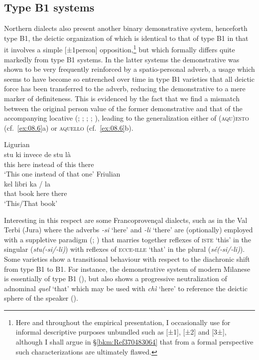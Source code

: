\documentclass[output=paper]{langsci/langscibook}
\begin{document}
\subsection{Type B1 systems}\label{bkm:Ref370487849}

Northern  dialects also present another binary demonstrative system,\linebreak
henceforth type B1, the deictic organization of which is identical to
that of type B1 in that it involves a simple [±1person]
opposition,\footnote{Here and throughout the empirical presentation, I
    occasionally use for informal descriptive purposes unbundled 
    such as [±1], [±2] and [3±], although I shall argue in
    §\ref{bkm:Ref370483064} that from a formal perspective such characterizations
are ultimately flawed.} but which formally differs quite markedly from type
B1 systems. In the latter systems the demonstrative was shown to be very
frequently reinforced by a spatio-personal adverb, a usage which seems to have
become so entrenched over time in type B1 varieties that all deictic
force has been transferred to the adverb, reducing the demonstrative to a mere
marker of definiteness. This is evidenced by the fact that we find a mismatch
between the original person value of the former demonstrative and that of the
accompanying locative (\citealt[21]{Berruto:1974a};
\citealt[171]{Azaretti:1982a}; \citealt[241]{Parry:1997a};
\citealt[112f]{Vanelli:1997a}; \citealt[107--110]{Irsara:2009a}), leading to
the generalization either of (\textsc{aqu)esto} (cf.\ \ref{ex:08.6}a) or \textsc{aquello} (cf.\ \ref{ex:08.6}b).

\ea\label{ex:08.6}
\ea\label{bkm:Ref370498429}Ligurian \citep{Azaretti:1982a}\\
\gll     stu  ki  invece  de  stu  là\\
this  here  instead  of  this  there\\
\glt \enquote*{This one instead of that one}
\ex Friulian \citep{Vanelli:1997a}\\
\gll  kel  libri  ka  /  la\\
that  book  here {} there\\
\glt \enquote*{This/That book}
\z
\z

Interesting in this respect are some Francoprovençal dialects, such as in the
Val Terbi (Jura) where the adverbs \emph{-si} ‘here’ and
\emph{-li} ‘there’ are (optionally) employed with a suppletive
paradigm (\citealt{Kjellman:1928a}; \citealt[85]{Butz:1981a}) that marries
together reflexes of \textsc{iste} ‘this’ in the singular (\emph{stu(-si/-li)})
with reflexes of \textsc{ecce-ille} ‘that’ in the plural (\emph{sé(-si/-li)}).
Some varieties show a transitional behaviour with respect to the diachronic
shift from type B1 to B1. For instance, the demonstrative system
of modern Milanese is essentially of type B1
(\citealt[79]{Ledgeway:2015a}), but also shows a progressive neutralization of
adnominal \emph{quel} ‘that’ which may be used with \emph{chì} ‘here’ to
reference the deictic sphere of the speaker (\citealt[108f]{Irsara:2009a}).
\end{document}
